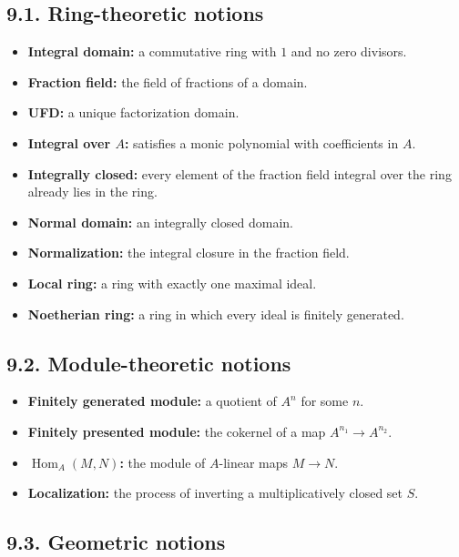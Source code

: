 \documentclass[12pt,a4paper]{article}
\theoremstyle{plain}
\theoremstyle{definition}      %
\begin{document}
\subsection*{9.1. Ring-theoretic notions}

\begin{itemize}
	\item \textbf{Integral domain:} a commutative ring with \(1\) and no zero divisors.
	\item \textbf{Fraction field:} the field of fractions of a domain.
	\item \textbf{UFD:} a unique factorization domain.
	\item \textbf{Integral over \(A\):} satisfies a monic polynomial with coefficients in \(A\).
	\item \textbf{Integrally closed:} every element of the fraction field integral over the ring already lies in the ring.
	\item \textbf{Normal domain:} an integrally closed domain.
	\item \textbf{Normalization:} the integral closure in the fraction field.
	\item \textbf{Local ring:} a ring with exactly one maximal ideal.
	\item \textbf{Noetherian ring:} a ring in which every ideal is finitely generated.
\end{itemize}

\subsection*{9.2. Module-theoretic notions}

\begin{itemize}
	\item \textbf{Finitely generated module:} a quotient of \(A^n\) for some \(n\).
	\item \textbf{Finitely presented module:} the cokernel of a map \(A^{n_1}\to A^{n_2}\).
	\item \textbf{\(\operatorname{Hom}_A(M,N)\):} the module of \(A\)-linear maps \(M\to N\).
	\item \textbf{Localization:} the process of inverting a multiplicatively closed set \(S\).
\end{itemize}

\subsection*{9.3. Geometric notions}
\end{document}
